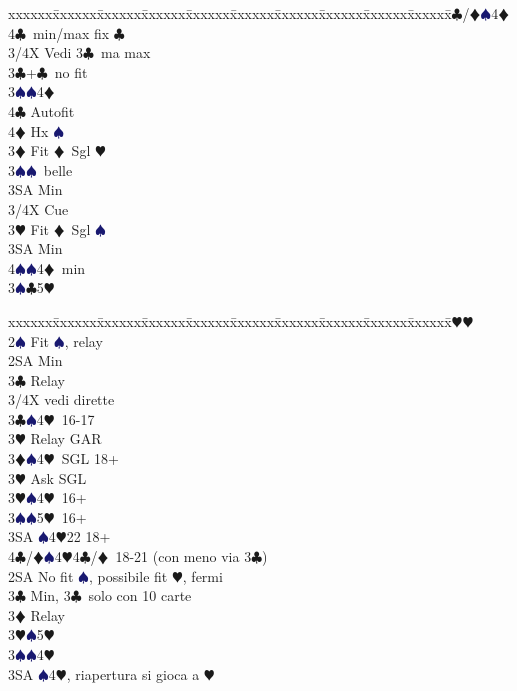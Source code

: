 \documentclass[a4paper,italian]{article}
\newcommand{\BC}{\textcolor{OliveGreen}{$\clubsuit$}}
\newcommand{\BD}{\textcolor{RedOrange}{$\vardiamondsuit$}}
\newcommand{\BH}{\textcolor{Red2}{$\varheartsuit${}}}
\newcommand{\BS}{\textcolor{MidnightBlue}{$\spadesuit${}}}
\newenvironment{bidtable}
{\begin{tabbing}

    xxxxxx\=xxxxxx\=xxxxxx\=xxxxxx\=xxxxxx\=xxxxxx\=xxxxxx\=xxxxxx\=xxxxxx\=xxxxxx\=\kill}
{\end{tabbing} }%
\begin{document}
\begin{multicols}{2}
\begin{bidtable}
        4\BC/\BD {}\BS 4\BD 4\BC\ min/max fix \BC \-\-\\
        3/4X \> Vedi 3\BC\ ma max\-\\
        3\BC {}+\BC\ no fit\+\\
        3\BS{}\BS 4\BD \+\\
        4\BC \> Autofit\\
        4\BD \> Hx \BS \-\-\\
        3\BD \> Fit \BD\ Sgl \BH \+\\
        3\BS {}\BS\ belle\\
        3SA \> Min\\
        3/4X \> Cue\-\\
        3\BH \> Fit \BD\ Sgl \BS \+\\
        3SA \> Min\\
        4\BS {}\BS 4\BD\ min\-\\
        3\BS {}\BC 5\BH \-\\
    \end{bidtable}
    \columnbreak
    \begin{bidtable}
        2\BH {}\BH \+\\
        2\BS \> Fit \BS , relay\+\\
        2SA \> Min\+\\
        3\BC \> Relay\+\\
        3/4X \> vedi dirette\-\-\\
        3\BC {}\BS 4\BH\ 16-17\+\\
        3\BH \> Relay GAR\-\\
        3\BD {}\BS 4\BH\ SGL 18+\+\\
        3\BH \> Ask SGL\-\\
        3\BH {}\BS 4\BH\ 16+\\
        3\BS {}\BS 5\BH\ 16+\\
        3SA \BS 4\BH 22 18+\\
        4\BC/\BD {}\BS 4\BH 4\BC/\BD\ 18-21 (con meno via 3\BC )\-\\
        2SA \> No fit \BS , possibile fit \BH , fermi\+\\
        3\BC \> Min, 3\BC\ solo con 10 carte\+\\
        3\BD \> Relay\+\\
        3\BH {}\BS 5\BH \\
        3\BS {}\BS 4\BH \\
        3SA \BS 4\BH , riapertura si gioca a \BH \\

\end{bidtable}
\end{multicols}
\end{document}
